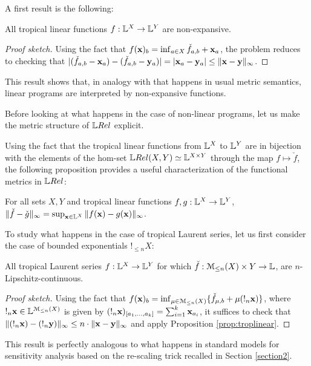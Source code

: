 A first result is the following:
\begin{proposition}\label{prop:troplinear}
All tropical linear functions $f: \mathbb{L}^{X}\to \mathbb{L}^{Y}$ are non-expansive.  
\end{proposition}
\begin{proof}[Proof sketch]
Using the fact that $f(\mathbf{x})_{b}= \inf_{a\in X}\check f_{a,b}+\mathbf{x}_{a}$,
the problem reduces to checking that $|(\check f_{a,b}-\mathbf{x}_{a})- (\check f_{a,b}-\mathbf{y}_{a})| = |\mathbf{x}_{a}-\mathbf{y}_{a}|\leq \| \mathbf{x}-\mathbf{y}\|_{\infty}$.\end{proof}
This result shows that, in analogy with that happens in usual metric semantics, linear programs are interpreted by non-expansive functions. 

Before looking at what happens in the case of non-linear programs, let us make the metric structure of $\LREL$ explicit. 

Using the fact that the tropical linear functions from $\mathbb{L}^{X}$ to $\mathbb{L}^{Y}$ are in bijection with the elements of the hom-set $\LREL(X,Y)\simeq \Lawv^{X\times Y}$ through the map $f\mapsto \check f$, the following proposition provides a useful characterization of the functional metrics in $\LREL$:
\begin{proposition}
For all sets $X,Y$ and tropical linear functions $f,g:\mathbb{L}^{X}\to \mathbb{L}^{Y}$, $\| \check f-\check g\|_{\infty} =  \sup_{\mathbf{x}\in \mathbb{L}^{X}}
\| f(\mathbf{x})-g(\mathbf{x})\|_{\infty}$.\end{proposition}

To study what happens in the case of tropical Laurent series, let us first consider the case of bounded exponentials $!_{\leq n}X$:
\begin{proposition}\label{prop:boundedlip}
All tropical Laurent series $f: \mathbb{L}^{X}\to \mathbb{L}^{Y}$ for which $\check f:{\mathcal{M}_{\leq n}(X)}\times Y\to \mathbb{L}$, are $n$-Lipschitz-continuous.
\end{proposition}
\begin{proof}[Proof sketch]
Using the fact that $f(\mathbf{x})_{b}=\inf_{\mu\in \mathcal{M}_{\leq n}(X)}\{ \check f_{\mu,b}+ \mu (!_{n}\mathbf{x}) \}$, where $!_{n}\mathbf{x}\in \mathbb{L}^{\mathcal{M}_{\leq n}(X)}$ is given by 
$(!_{n}\mathbf{x})_{[a_{1},\dots, a_{k}]}=\sum_{i=1}^{k}\mathbf{x}_{a_{i}}$, 
it suffices to check that $\| (!_{n}\mathbf{x})-(!_{n}\mathbf{y})\|_{\infty}\leq n\cdot \| \mathbf{x}-\mathbf{y}\|_{\infty}$ and apply Proposition \ref{prop:troplinear}.
\end{proof}
This result is perfectly analogous to what happens in standard models for sensitivity analysis based on the re-scaling trick recalled in Section \ref{section2}.

